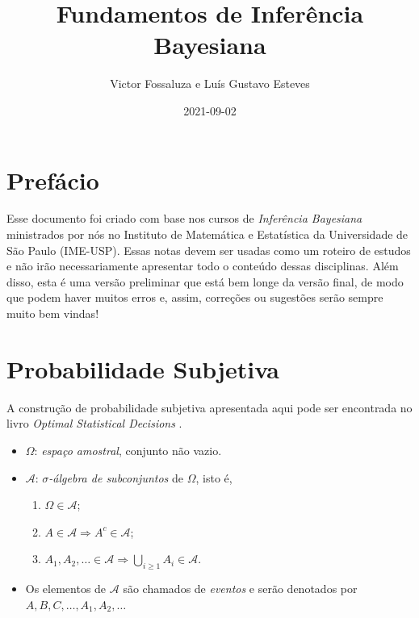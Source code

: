 \documentclass[
]{book}
\title{Fundamentos de Inferência Bayesiana}
\author{Victor Fossaluza e Luís Gustavo Esteves}
\date{2021-09-02}
\providecommand{\tightlist}{%
  \setlength{\itemsep}{0pt}\setlength{\parskip}{0pt}}
\begin{document}
\maketitle

{
\setcounter{tocdepth}{1}
\tableofcontents
}
\hypertarget{prefuxe1cio}{%
\chapter{Prefácio}\label{prefuxe1cio}}

Esse documento foi criado com base nos cursos de \emph{Inferência Bayesiana} ministrados por nós no Instituto de Matemática e Estatística da Universidade de São Paulo (IME-USP). Essas notas devem ser usadas como um roteiro de estudos e não irão necessariamente apresentar todo o conteúdo dessas disciplinas. Além disso, esta é uma versão preliminar que está bem longe da versão final, de modo que podem haver muitos erros e, assim, correções ou sugestões serão sempre muito bem vindas!

\hypertarget{ProbSubj}{%
\chapter{Probabilidade Subjetiva}\label{ProbSubj}}

A construção de probabilidade subjetiva apresentada aqui pode ser encontrada no livro \emph{Optimal Statistical Decisions} \citep{DeGroot70}.

\begin{itemize}
\item
  \(\Omega\): \emph{espaço amostral}, conjunto não vazio.
\item
  \(\mathcal{A}\): \emph{\(\sigma\)-álgebra de subconjuntos} de \(\Omega\), isto é,

  \begin{enumerate}
  \def\labelenumi{\arabic{enumi}.}
  \tightlist
  \item
    \(\Omega \in \mathcal{A}\);
  \item
    \(A \in \mathcal{A} \Longrightarrow A^{c} \in \mathcal{A}\);
  \item
    \(\displaystyle A_1, A_2, \ldots \in \mathcal{A} \Longrightarrow \bigcup_{i\geq1} A_i \in \mathcal{A}\).
  \end{enumerate}
\item
  Os elementos de \(\mathcal{A}\) são chamados de \emph{eventos} e serão denotados por \(A, B, C, \ldots, A_1, A_2, \ldots\)
\end{itemize}
\end{document}
